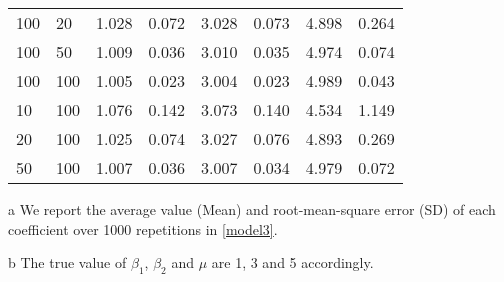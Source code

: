 \documentclass[a4paper]{article}
\begin{document}
\begin{table}[]
\begin{threeparttable}
\begin{tabular}{llllllll}
100 & 20  & 1.028                                                        & 0.072 & 3.028                                                        & 0.073 & 4.898                                                    & 0.264 \\
100 & 50  & 1.009                                                        & 0.036 & 3.010                                                        & 0.035 & 4.974                                                    & 0.074 \\
100 & 100 & 1.005                                                        & 0.023 & 3.004                                                        & 0.023 & 4.989                                                    & 0.043 \\
10  & 100 & 1.076                                                        & 0.142 & 3.073                                                        & 0.140 & 4.534                                                    & 1.149 \\
20  & 100 & 1.025                                                        & 0.074 & 3.027                                                        & 0.076 & 4.893                                                    & 0.269 \\
50  & 100 & 1.007                                                        & 0.036 & 3.007                                                        & 0.034 & 4.979                                                    & 0.072 \\ \hline
\end{tabular}

\begin{tablenotes}
        \footnotesize
        \item[a]  We report the average value (Mean) and root-mean-square error (SD) of each coefficient over 1000 repetitions in \eqref{model3}.
        \item[b] The true value of $\beta_1$, $\beta_2$ and $\mu$ are 1, 3 and 5 accordingly.
      \end{tablenotes}
\end{threeparttable}

\end{table}
\end{document}
